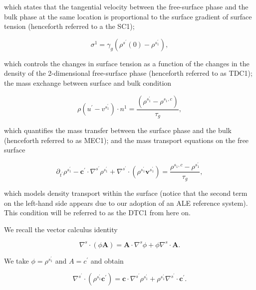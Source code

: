 \documentclass{article}
\begin{document}
which states that the tangential velocity between the free-surface phase and the bulk phase at the same location is proportional to the surface gradient of surface tension (henceforth referred to a the SC1);

\begin{equation}
\sigma^{1} = \gamma_{g}\left(\rho^{s^{\prime}}(0) - \rho^{s_{1}^{\prime}}\right), \tag{2.12}
\end{equation}

which controls the changes in surface tension as a function of the changes in the density of the 2-dimensional free-surface phase (henceforth referred to as TDC1); the mass exchange between surface and bulk condition

\begin{equation}
\rho (u^{\prime} - v^{s_{1}^{\prime}})\cdot n^{1} = \frac{(\rho^{s_{1}^{\prime}} - \rho^{s_{1},c})}{\tau_{g}}, \tag{2.13}
\end{equation}

which quantifies the mass transfer between the surface phase and the bulk (henceforth referred to as MEC1); and the mass transport equations on the free surface

\begin{equation}
\partial_{t^{\prime}}\rho^{s_{1}^{\prime}} - \pmb{c}^{\prime}\cdot \nabla^{s^{\prime}}\rho^{s_{1}^{\prime}} + \nabla^{s^{\prime}}\cdot (\rho^{s_{1}^{\prime}}\pmb{v}^{s_{1}^{\prime}}) = \frac{\rho^{s_{1},c} - \rho^{s_{1}^{\prime}}}{\tau_{g}}, \tag{2.14}
\end{equation}

which models density transport within the surface (notice that the second term on the left-hand side appears due to our adoption of an ALE reference system). This condition will be referred to as the DTC1 from here on.

We recall the vector calculus identity

\begin{equation}
\nabla^{s}\cdot (\phi \pmb {A}) = \pmb {A}\cdot \nabla^{s}\phi +\phi \nabla^{s}\cdot \pmb {A}. \tag{2.15}
\end{equation}

We take \(\phi = \rho^{s_{1}^{\prime}}\) and \(A = c^{\prime}\) and obtain

\begin{equation}
\nabla^{s^{\prime}}\cdot (\rho^{s_{1}^{\prime}}\pmb {c}^{\prime}) = \pmb {c}\cdot \nabla^{s^{\prime}}\rho^{s_{1}^{\prime}} + \rho^{s_{1}^{\prime}}\nabla^{s^{\prime}}\cdot \pmb {c}^{\prime}. \tag{2.16}
\end{equation}
\end{document}
